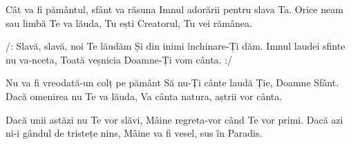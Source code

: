 \beginverse
Cât va fi pământul, sfânt va răsuna
Imnul adorării pentru slava Ta.
Orice neam sau limbă Te va lăuda,
Tu ești Creatorul, Tu vei rămânea.
\endverse

\beginchorus
/: Slavă, slavă, noi Te lăudăm
Și din inimi închinare-Ți dăm.
Imnul laudei sfinte nu va-nceta,
Toată veșnicia Doamne-Ți vom cânta. :/
\endchorus

\beginverse
Nu va fi vreodată-un colț pe pământ
Să nu-Ți cânte laudă Ție, Doamne Sfânt.
Dacă omenirea nu Te va lăuda,
Va cânta natura, aștrii vor cânta.
\endverse

\beginverse
Dacă unii astăzi nu Te vor slăvi,
Mâine regreta-vor când Te vor primi.
Dacă azi ni-i gândul de tristețe nins,
Mâine va fi vesel, sus în Paradis.
\endverse
\endsong